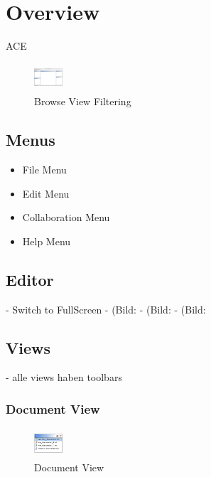 \documentclass[11pt,a4paper]{article}
\begin{document}
\newpage
\section{Overview}
ACE 
\begin{figure}[htbp]
\begin{center}
  \includegraphics[height=30pt, width=30pt]{../images/usermanual/ace_overview.bmp.eps}
\caption{Browse View Filtering}
\label{default}
\end{center}
\end{figure}


\subsection{Menus}
\begin{itemize}
\item File Menu
\item Edit Menu
\item Collaboration Menu
\item Help Menu
\end{itemize}

\subsection{Editor}
- Switch to FullScreen
- (Bild: %
- (Bild: %
- (Bild: %

\subsection{Views}
- alle views haben toolbars

\subsubsection{Document View}
\begin{figure}[htbp]
\begin{center}
  \includegraphics[height=30pt, width=30pt]{../images/usermanual/dview_overview.bmp.eps}
\caption{Document View}
\label{default}
\end{center}
\end{figure}
\end{document}
